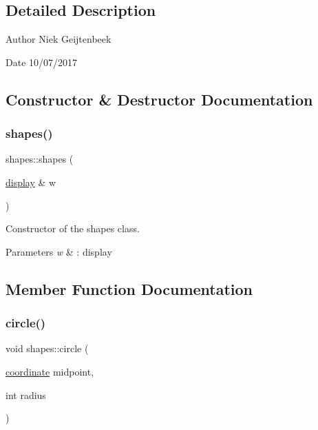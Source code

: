 \subsection{Detailed Description}
\begin{DoxyAuthor}{Author}
Niek Geijtenbeek 
\end{DoxyAuthor}
\begin{DoxyDate}{Date}
10/07/2017 
\end{DoxyDate}


\subsection{Constructor \& Destructor Documentation}
\mbox{\label{classshapes_a61a7ba5ffd8f704b42f61a01f35ee653}} 
\subsubsection{\texorpdfstring{shapes()}{shapes()}}
{\footnotesize\ttfamily shapes\+::shapes (\begin{DoxyParamCaption}\item[{\hyperlink{classdisplay}{display} \&}]{w }\end{DoxyParamCaption})\hspace{0.3cm}{\ttfamily [inline]}}



Constructor of the shapes class. 


\begin{DoxyParams}{Parameters}
{\em w} & \+: display \\
\hline
\end{DoxyParams}


\subsection{Member Function Documentation}
\mbox{\label{classshapes_a7da31426ad907ab181bd862a3f9789c9}} 
\subsubsection{\texorpdfstring{circle()}{circle()}}
{\footnotesize\ttfamily void shapes\+::circle (\begin{DoxyParamCaption}\item[{\hyperlink{classcoordinate}{coordinate}}]{midpoint,  }\item[{int}]{radius }\end{DoxyParamCaption})\hspace{0.3cm}{\ttfamily [inline]}}



